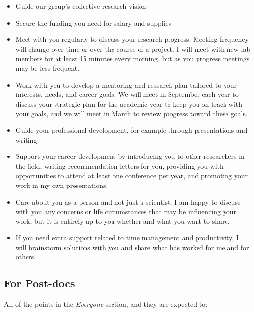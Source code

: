 \documentclass[
]{book}
\providecommand{\tightlist}{%
  \setlength{\itemsep}{0pt}\setlength{\parskip}{0pt}}
\begin{document}
\begin{itemize}
\tightlist
\item
  Guide our group's collective research vision
\item
  Secure the funding you need for salary and supplies
\item
  Meet with you regularly to discuss your research progress. Meeting frequency will change over time or over the course of a project. I will meet with new lab members for at least 15 minutes every morning, but as you progress meetings may be less frequent.
\item
  Work with you to develop a mentoring and research plan tailored to your interests, needs, and career goals. We will meet in September each year to discuss your strategic plan for the academic year to keep you on track with your goals, and we will meet in March to review progress toward these goals.
\item
  Guide your professional development, for example through presentations and writing
\item
  Support your career development by introducing you to other researchers in the field, writing recommendation letters for you, providing you with opportunities to attend at least one conference per year, and promoting your work in my own presentations.
\item
  Care about you as a person and not just a scientist. I am happy to discuss with you any concerns or life circumstances that may be influencing your work, but it is entirely up to you whether and what you want to share.
\item
  If you need extra support related to time management and productivity, I will brainstorm solutions with you and share what has worked for me and for others.
\end{itemize}

\hypertarget{for-post-docs}{%
\subsection{For Post-docs}\label{for-post-docs}}

All of the points in the \emph{Everyone} section, and they are expected to:
\end{document}
